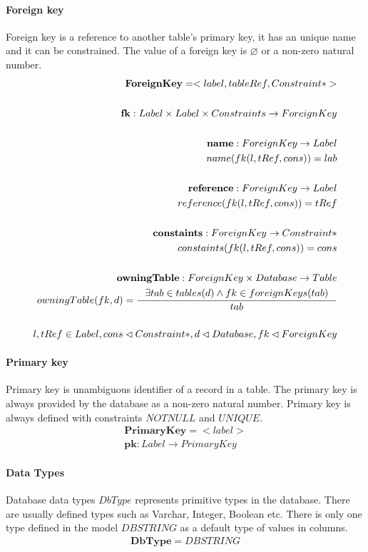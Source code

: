 \documentclass[11pt]{article}
\begin{document}
\paragraph{Foreign key} Foreign key is a reference to another table's primary key, it has an unique name and it can be constrained. The value of a foreign key is $\varnothing$ or a non-zero natural number.
\begin{align*}
	\mathbf{ForeignKey} = <label, tableRef, Constraint*> \\ \\
	\mathbf{fk} : Label \times Label \times Constraints \rightarrow ForeignKey \\ \\
	\mathbf{name} : ForeignKey \rightarrow Label \\
	name(fk(l, tRef, cons)) = lab  \\ \\
	\mathbf{reference} : ForeignKey \rightarrow Label  \\
	reference(fk(l, tRef, cons)) = tRef  \\ \\
	\mathbf{constaints} : ForeignKey \rightarrow Constraint*  \\
	constaints(fk(l, tRef, cons)) = cons  \\ \\
	\mathbf{owningTable} : ForeignKey \times Database \rightarrow Table  \\
	owningTable(fk, d) = \inference{\exists tab \in tables(d) \wedge fk \in foreignKeys(tab)}{tab}\\\\
	l, tRef \in Label, cons \lhd Constraint*,d \lhd Database, fk \lhd ForeignKey
\end{align*}


\paragraph{Primary key} Primary key is unambiguous identifier of a record in a table. The primary key is always provided by the database as a non-zero natural number. Primary key is always defined with constraints $NOTNULL$ and $UNIQUE$. 
\begin{align*}
	\mathbf{PrimaryKey} =  < label > 	\\
	\mathbf{pk} : Label \rightarrow PrimaryKey
\end{align*}

\paragraph{Data Types} Database data types $DbType$ represents primitive types in the database. There are usually defined types such as Varchar, Integer, Boolean etc. There is only one type defined in the model $DBSTRING$ as a default type of values in columns.
\begin{align*}
	\mathbf{DbType} = DBSTRING
\end{align*}
\end{document}
